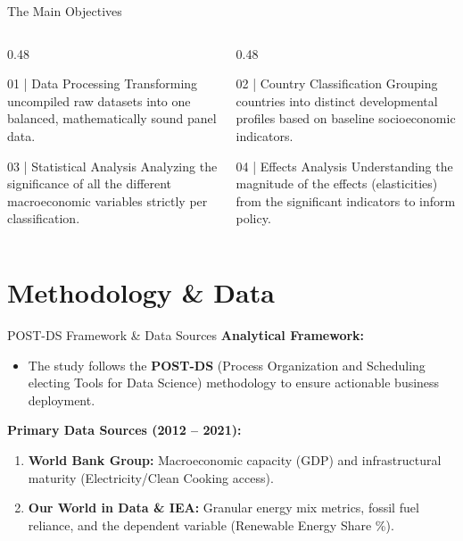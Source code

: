 \documentclass[aspectratio=169]{beamer}
\begin{document}
\begin{frame}{The Main Objectives}
  \begin{columns}[T]
    \begin{column}{0.48\textwidth}
      \begin{block}{01 | Data Processing}
        Transforming uncompiled raw datasets into one balanced, mathematically sound panel data.
      \end{block}
      \vspace{0.3cm}
      \begin{block}{03 | Statistical Analysis}
        Analyzing the significance of all the different macroeconomic variables strictly per classification.
      \end{block}
    \end{column}
    
    \begin{column}{0.48\textwidth}
      \begin{block}{02 | Country Classification}
        Grouping countries into distinct developmental profiles based on baseline socioeconomic indicators.
      \end{block}
      \vspace{0.3cm}
      \begin{block}{04 | Effects Analysis}
        Understanding the magnitude of the effects (elasticities) from the significant indicators to inform policy.
      \end{block}
    \end{column}
  \end{columns}
\end{frame}

\section{Methodology \& Data}

\begin{frame}{POST-DS Framework \& Data Sources}
  \textbf{Analytical Framework:}
  \begin{itemize}
      \item The study follows the \textbf{POST-DS} (Process Organization and Scheduling electing Tools for Data Science) methodology to ensure actionable business deployment.
  \end{itemize}
  \vspace{0.3cm}
  
  \textbf{Primary Data Sources (2012 -- 2021):}
  \begin{enumerate}
      \item \textbf{World Bank Group:} Macroeconomic capacity (GDP) and infrastructural maturity (Electricity/Clean Cooking access).
      \item \textbf{Our World in Data \& IEA:} Granular energy mix metrics, fossil fuel reliance, and the dependent variable (Renewable Energy Share \%).
  \end{enumerate}
\end{frame}
\end{document}
